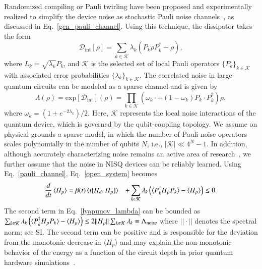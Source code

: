 \documentclass[10pt, superscriptaddress,aps,pra,twocolumn,showpacs,nofootinbib, longbibliography, notitlepage,floatfix]{revtex4-2}
\begin{document}
Randomized compiling or Pauli twirling have been proposed and experimentally realized to simplify the device noise as stochastic Pauli noise channels~\cite{Blatt_nat_comm_2019, vandenBerg2023_natphys, Kim2023}, as discussed in Eq.~\eqref{gen_pauli_channel}. Using this technique, the dissipator takes the form~\cite{EmersonPRA2016, Blatt_nat_comm_2019} 
\begin{equation}
    \mathcal{D}_{\text{int}} [\rho] = \sum_{k\in \mathcal{K}} \lambda_k (P_k \rho P_k^{\dagger} - \rho),\label{pauli_channel}
\end{equation}
where $L_k = \sqrt{\lambda_k} P_k$, and $\mathcal{K}$ is the selected set of local Pauli operators $\{P_k\}_{k\in\mathcal{K}}$ with associated error probabilities $\{\lambda_k\}_{k\in\mathcal{K}}$. The correlated noise in large quantum circuits can be modeled as a sparse channel and is given by~\cite{vandenBerg2023_natphys}
\begin{equation}
    \Lambda(\rho) = \text{exp}[\mathcal{D}_{\text{int}}](\rho) = 
    \prod_{k\in\mathcal{K}} \left( \omega_k \cdot + (1-\omega_k) P_k \cdot P_k^{\dagger} \right) \rho, \label{noise_channel_Lambda1}
\end{equation}
where $\omega_k = (1+e^{-2\lambda_k})/2$.  Here, $\mathcal{K}$ represents the local noise interactions of the quantum device, which is governed by the qubit-coupling topology. 
We assume on physical grounds a sparse model, in which the number of Pauli noise operators scales polynomially in the number of qubits $N$, i.e., $|\mathcal{K}| \ll 4^N-1$. 
In addition, although accurately characterizing noise remains an active area of research~\cite{PRXQuantum_Zoller_2022, Chen2023}, we further assume that the noise in NISQ devices can be reliably learned. Using Eq.~\eqref{pauli_channel},  Eq.~\eqref{open_system} becomes
\begin{equation}
\begin{split}
    \frac{d}{dt} \braket{H_p} & = \beta(t)  \braket{i[H_d, H_p]} 
    & + \sum_{k\in \mathcal{K}} \lambda_k \left(\braket{ P_k^\dagger H_p P_k } - \braket{H_p}\right) \leq 0. \label{lyapunov_lambda}
\end{split}
\end{equation}
{The second term in Eq.~\eqref{lyapunov_lambda} can be bounded as $\sum_{k\in \mathcal{K}} \lambda_k \left(\braket{ P_k^\dagger H_p P_k } - \braket{H_p}\right) \leq 2 ||H_p|| \sum_{k\in \mathcal{K}} \lambda_k \equiv \Lambda_\mathrm{noise} $ where $||\cdot||$ denotes the spectral norm; see SI. The second term can} be positive and is responsible for the deviation from the monotonic decrease in $\langle H_p \rangle$ and may explain the non-monotonic behavior of the energy as a function of the circuit depth in prior quantum hardware simulations~\cite{SarovarPRL2022, RKMalla_PRR_2024}.  
\end{document}
